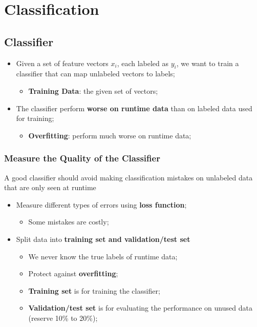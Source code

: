 \chapter{Classification}

\section{Classifier}

  \begin{itemize}
    \item Given a set of feature vectors $ x_{i} $, each labeled as $ y_{i} $, we want to train a classifier that can map unlabeled vectors to labels;
    \begin{itemize}
      \item \textbf{Training Data}: the given set of vectors;
    \end{itemize}
    
    \item The classifier perform \textbf{worse on runtime data} than on labeled data used for training;
    \begin{itemize}
      \item \textbf{Overfitting}: perform much worse on runtime data;
    \end{itemize}
    
  \end{itemize}
  
  \subsection{Measure the Quality of the Classifier}
  
    A good classifier should avoid making classification mistakes on unlabeled data that are only seen at runtime
    
    \begin{itemize}
      \item Measure different types of errors using \textbf{loss function};
      \begin{itemize}
        \item Some mistakes are costly;
      \end{itemize}
      
      \item Split data into \textbf{training set and validation/test set}
      \begin{itemize}
        \item We never know the true labels of runtime data;
        \item Protect against \textbf{overfitting};
        \item \textbf{Training set} is for training the classifier;
        \item \textbf{Validation/test set} is for evaluating the performance on unused data (reserve 10\% to 20\%);
      \end{itemize}
    \end{itemize}
    
